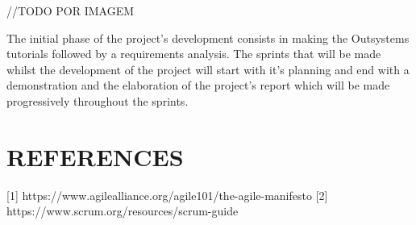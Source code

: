 \documentclass[a4paper,openright,12pt]{report}
\begin{document}
//TODO POR IMAGEM 

The initial phase of the project's development consists in making the Outsystems tutorials followed by a requirements analysis. The sprints that will be made whilst the development of the project will start with it's planning and end with a demonstration and the elaboration of the project's report which will be made progressively throughout the sprints.

\section*{REFERENCES}

[1] https://www.agilealliance.org/agile101/the-agile-manifesto 
[2] https://www.scrum.org/resources/scrum-guide
\end{document}
